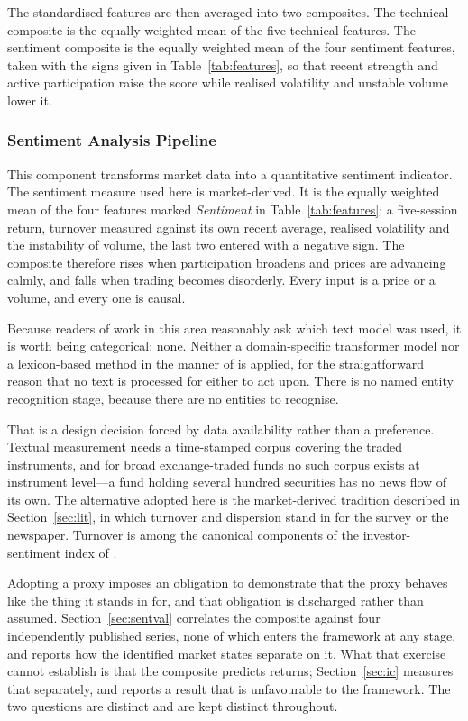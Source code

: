 The standardised features are then averaged into two composites. The technical composite
is the equally weighted mean of the five technical features. The sentiment composite is
the equally weighted mean of the four sentiment features, taken with the signs given in
Table~\ref{tab:features}, so that recent strength and active participation raise the
score while realised volatility and unstable volume lower it.

\subsubsection{Sentiment Analysis Pipeline}
\label{sec:sentiment}

This component transforms market data into a quantitative sentiment indicator. The
sentiment measure used here is market-derived. It is the equally weighted mean of the
four features marked \emph{Sentiment} in Table~\ref{tab:features}: a five-session return,
turnover measured against its own recent average, realised volatility and the instability
of volume, the last two entered with a negative sign. The composite therefore rises when
participation broadens and prices are advancing calmly, and falls when trading becomes
disorderly. Every input is a price or a volume, and every one is causal.

Because readers of work in this area reasonably ask which text model was used, it is
worth being categorical: none. Neither a domain-specific transformer model nor a
lexicon-based method in the manner of \citet{loughran11} is applied, for the
straightforward reason that no text is processed for either to act upon. There is no
named entity recognition stage, because there are no entities to recognise.

That is a design decision forced by data availability rather than a preference. Textual
measurement needs a time-stamped corpus covering the traded instruments, and for broad
exchange-traded funds no such corpus exists at instrument level---a fund holding several
hundred securities has no news flow of its own. The alternative adopted here is the
market-derived tradition described in Section~\ref{sec:lit}, in which turnover and
dispersion stand in for the survey or the newspaper. Turnover is among the canonical
components of the investor-sentiment index of \citet{bakerwurgler07}.

Adopting a proxy imposes an obligation to demonstrate that the proxy behaves like the
thing it stands in for, and that obligation is discharged rather than assumed.
Section~\ref{sec:sentval} correlates the composite against four independently published
series, none of which enters the framework at any stage, and reports how the identified
market states separate on it. What that exercise cannot establish is that the composite
predicts returns; Section~\ref{sec:ic} measures that separately, and reports a result
that is unfavourable to the framework. The two questions are distinct and are kept
distinct throughout.

